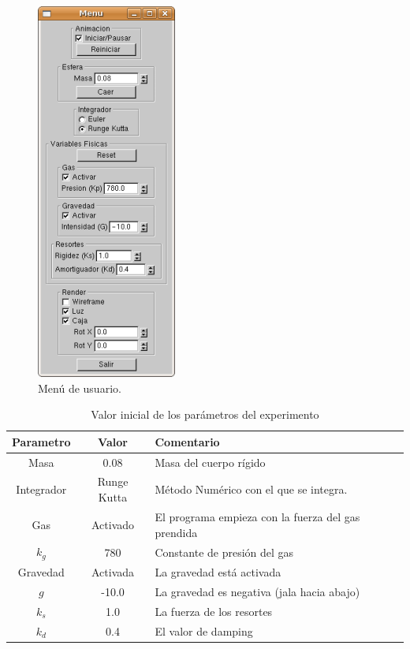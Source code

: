 \begin{figure}
 \centering
 \includegraphics[]{Img/menu}
 \caption[Menú de usuario del programa]{Menú de usuario.}
 \label{programa:menu}
\end{figure}

\begin{table}
\caption[Tabla con los valores de defecto de los parámetros]{Valor inicial de los parámetros del experimento}
\label{valores:variables}
\begin{center}
\begin{tabular} {|c|c|p{10cm}|} \hline
Parametro & Valor & Comentario\\ \hline
 Masa & 0.08 & Masa del cuerpo rígido \\
 Integrador & Runge Kutta & Método Numérico con el que se integra. \\
 Gas & Activado & El programa empieza con la fuerza del gas prendida \\
 $k_g$ & 780 & Constante de presión del gas \\
 Gravedad & Activada & La gravedad está activada \\
 $g$ & -10.0 & La gravedad es negativa (jala hacia abajo) \\
 $k_s$ & 1.0 & La fuerza de los resortes \\
 $k_d$ & 0.4 & El valor de damping \\
\hline
\end{tabular}
\end{center}
\end{table}

